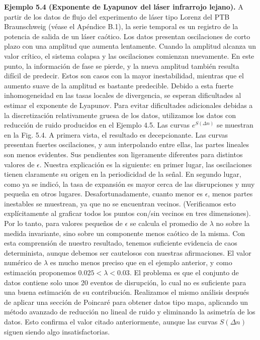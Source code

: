 \documentclass[10pt,a4paper]{book}
\begin{document}
\textbf{Ejemplo 5.4 (Exponente de Lyapunov del láser infrarrojo lejano).} A partir de los datos de flujo del experimento de láser tipo Lorenz del PTB Braunschweig (véase el Apéndice B.1), la serie temporal es un registro de la potencia de salida de un láser caótico. Los datos presentan oscilaciones de corto plazo con una amplitud que aumenta lentamente. Cuando la amplitud alcanza un valor crítico, el sistema colapsa y las oscilaciones comienzan nuevamente. En este punto, la información de fase se pierde, y la nueva amplitud también resulta difícil de predecir. Estos son casos con la mayor inestabilidad, mientras que el aumento suave de la amplitud es bastante predecible. Debido a esta fuerte inhomogeneidad en las tasas locales de divergencia, se esperan dificultades al estimar el exponente de Lyapunov. Para evitar dificultades adicionales debidas a la discretización relativamente gruesa de los datos, utilizamos los datos con reducción de ruido producidos en el Ejemplo 4.5. Las curvas \( e^{S(\Delta n)} \) se muestran en la Fig. 5.4. A primera vista, el resultado es decepcionante. Las curvas presentan fuertes oscilaciones, y aun interpolando entre ellas, las partes lineales son menos evidentes. Sus pendientes son ligeramente diferentes para distintos valores de \( \epsilon \). Nuestra explicación es la siguiente: en primer lugar, las oscilaciones tienen claramente su origen en la periodicidad de la señal. En segundo lugar, como ya se indicó, la tasa de expansión es mayor cerca de las disrupciones y muy pequeña en otros lugares. Desafortunadamente, cuanto menor es \( \epsilon \), menos partes inestables se muestrean, ya que no se encuentran vecinos. (Verificamos esto explícitamente al graficar todos los puntos con/sin vecinos en tres dimensiones). Por lo tanto, para valores pequeños de \( \epsilon \) se calcula el promedio de \( \lambda \) no sobre la medida invariante, sino sobre un componente menos caótico de la misma. Con esta comprensión de nuestro resultado, tenemos suficiente evidencia de caos determinista, aunque debemos ser cautelosos con nuestras afirmaciones. El valor numérico de \( \lambda \) es mucho menos preciso que en el ejemplo anterior, y como estimación proponemos \( 0.025 < \lambda < 0.03 \). El problema es que el conjunto de datos contiene solo unos 20 eventos de disrupción, lo cual no es suficiente para una buena estimación de su contribución. Realizamos el mismo análisis después de aplicar una sección de Poincaré para obtener datos tipo mapa, aplicando un método avanzado de reducción no lineal de ruido y eliminando la asimetría de los datos. Esto confirma el valor citado anteriormente, aunque las curvas \( S(\Delta n) \) siguen siendo algo insatisfactorias.
\end{document}
